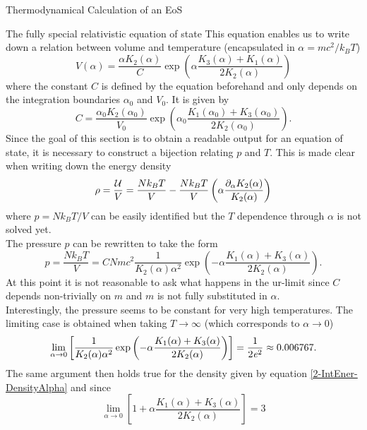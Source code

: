 \begin{section}{Thermodynamical Calculation of an EoS}
\begin{subsection}{The fully special relativistic equation of state}
This equation enables us to write down a relation between volume and temperature (encapsulated in $\alpha=mc^2/k_BT$)
\begin{equation}
	V(\alpha) = \frac{\alpha K_2(\alpha)}{C}\exp\left(\alpha\frac{K_3(\alpha)+K_1(\alpha)}{2K_2(\alpha)}\right)
\end{equation}
where the constant $C$ is defined by the equation beforehand and only depends on the integration boundaries $\alpha_0$ and $V_0$. It is given by
\begin{equation}
	C = \frac{\alpha_0 K_2(\alpha_0)}{V_0}\exp\left(\alpha_0\frac{K_1(\alpha_0)+K_3(\alpha_0)}{2K_2(\alpha_0)}\right).
\end{equation}
Since the goal of this section is to obtain a readable output for an equation of state, it is necessary to construct a bijection relating $p$ and $T$. This is made clear when writing down the energy density
\begin{equation}
	\rho = \frac{\mathcal{U}}{V} = \frac{Nk_BT}{V} - \frac{Nk_BT}{V}\left(\alpha\frac{\partial_\alpha K_2(\alpha)}{K_2(\alpha)}\right)
	\label{2-IntEner-DensityAlpha}
\end{equation}
where $p=Nk_BT/V$ can be easily identified but the $T$ dependence through $\alpha$ is not solved yet.\\
The pressure $p$ can be rewritten to take the form
\begin{equation}
	p = \frac{Nk_BT}{V} = CNmc^2\frac{1}{K_2(\alpha)\alpha^2}\exp\left(-\alpha\frac{K_1(\alpha)+K_3(\alpha)}{2K_2(\alpha)}\right).
	\label{2-IntEner-PressureAlpha}
\end{equation}
At this point it is not reasonable to ask what happens in the ur-limit since $C$ depends non-trivially on $m$ and $m$ is not fully substituted in $\alpha$.\\
Interestingly, the pressure seems to be constant for very high temperatures. The limiting case is obtained when taking $T\rightarrow\infty$ (which corresponds to $\alpha\rightarrow0$)
\begin{equation}
	\lim\limits_{\alpha\to0}\left[\frac{1}{K_2(\alpha)\alpha^2}\exp\left(-\alpha\frac{K_1(\alpha)+K_3(\alpha)}{2K_2(\alpha)}\right)\right] = \frac{1}{2\mathit{e}^2} \approx 0.006767.
\end{equation}
The same argument then holds true for the density given by equation \ref{2-IntEner-DensityAlpha} and since 
\begin{equation}
	\lim\limits_{\alpha\to0}\left[1+\alpha\frac{K_1(\alpha)+K_3(\alpha)}{2K_2(\alpha)}\right] = 3
\end{equation}

\end{subsection}
\end{section}
